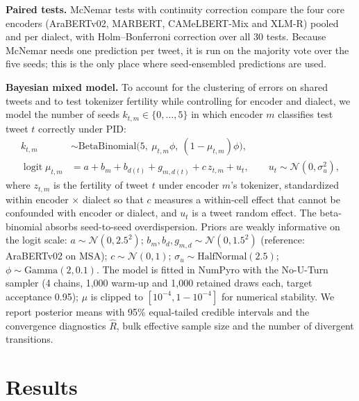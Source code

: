 \documentclass[11pt]{article}
\begin{document}
\textbf{Paired tests.} McNemar tests with continuity correction compare the four core encoders (AraBERTv02, MARBERT, CAMeLBERT-Mix and XLM-R) pooled and per dialect, with Holm--Bonferroni correction over all 30 tests. Because McNemar needs one prediction per tweet, it is run on the majority vote over the five seeds; this is the only place where seed-ensembled predictions are used.

\textbf{Bayesian mixed model.} To account for the clustering of errors on shared tweets and to test tokenizer fertility while controlling for encoder and dialect, we model the number of seeds $k_{t,m}\in\{0,\dots,5\}$ in which encoder $m$ classifies test tweet $t$ correctly under PID:
\begin{align}
k_{t,m} &\sim \text{BetaBinomial}\big(5,\ \mu_{t,m}\phi,\ (1-\mu_{t,m})\phi\big), \nonumber\\
\operatorname{logit}\mu_{t,m} &= a + b_m + b_{d(t)} + g_{m,d(t)} + c\,z_{t,m} + u_t, \qquad u_t\sim\mathcal{N}(0,\sigma_u^2),
\end{align}
where $z_{t,m}$ is the fertility of tweet $t$ under encoder $m$'s tokenizer, standardized within encoder $\times$ dialect so that $c$ measures a within-cell effect that cannot be confounded with encoder or dialect, and $u_t$ is a tweet random effect. The beta-binomial absorbs seed-to-seed overdispersion. Priors are weakly informative on the logit scale: $a\sim\mathcal{N}(0,2.5^2)$; $b_m, b_d, g_{m,d}\sim\mathcal{N}(0,1.5^2)$ (reference: AraBERTv02 on MSA); $c\sim\mathcal{N}(0,1)$; $\sigma_u\sim\text{HalfNormal}(2.5)$; $\phi\sim\text{Gamma}(2,0.1)$. The model is fitted in NumPyro \cite{phan2019numpyro} with the No-U-Turn sampler \cite{hoffman2014nuts} (4 chains, 1,000 warm-up and 1,000 retained draws each, target acceptance 0.95); $\mu$ is clipped to $[10^{-4},1-10^{-4}]$ for numerical stability. We report posterior means with 95\% equal-tailed credible intervals and the convergence diagnostics $\hat R$, bulk effective sample size and the number of divergent transitions.

\section{Results}
\label{sec:results}
\end{document}
